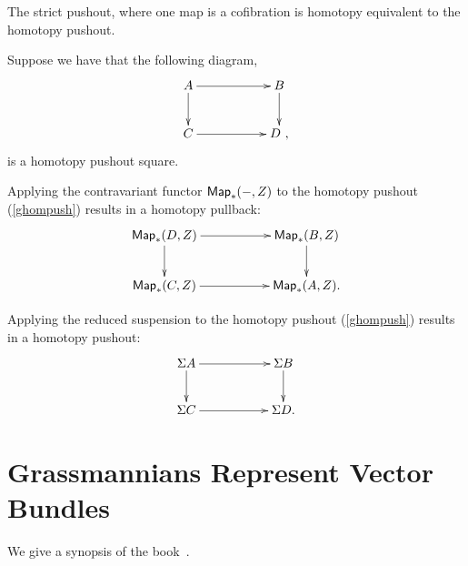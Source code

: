 \begin{prop}
The strict pushout, where one map is a cofibration is homotopy equivalent to the homotopy pushout.
\end{prop}

Suppose we have that the following diagram,
\begin{equation} \label{ghompush}
\xymatrix{
A \ar[rr]^-{} \ar[d]_-{}
&&
B \ar[d]^{}
\\
C \ar[rr]^{}
&&
D~,
}
\end{equation}
is a homotopy pushout square. 

\begin{prop}
Applying the contravariant functor ${\sf Map}_{\ast}(-, Z)$ to the homotopy pushout (\ref{ghompush}) results in a homotopy pullback:
\[
\xymatrix{
{\sf Map}_{\ast}(D, Z) \ar[rr]^-{} \ar[d]_-{}
&&
{\sf Map}_{\ast}(B, Z) \ar[d]^{}
\\
{\sf Map}_{\ast}(C, Z) \ar[rr]^{}
&&
{\sf Map}_{\ast}(A, Z).
}
\]

\end{prop}

\begin{prop}
Applying the reduced suspension to the homotopy pushout (\ref{ghompush}) results in a homotopy pushout:
\[
\xymatrix{
\Sigma A \ar[rr]^-{} \ar[d]_-{}
&&
\Sigma B \ar[d]^{}
\\
\Sigma C \ar[rr]^{}
&&
\Sigma D.
}
\]
\end{prop}







\section{Grassmannians Represent Vector Bundles}


We give a synopsis of the book~\cite{MilStash}.

